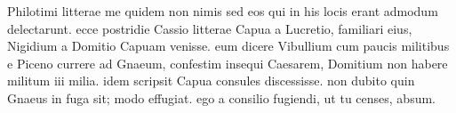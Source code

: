 


 Philotimi litterae me quidem non nimis sed eos qui in his locis erant admodum delectarunt. ecce postridie Cassio litterae Capua a Lucretio, familiari eius, Nigidium a Domitio Capuam venisse. eum dicere Vibullium cum paucis militibus e Piceno currere ad Gnaeum, confestim insequi Caesarem, Domitium non habere militum iii milia. idem scripsit Capua consules discessisse. non dubito quin Gnaeus in fuga sit; modo effugiat. ego a consilio fugiendi, ut tu censes, absum.
